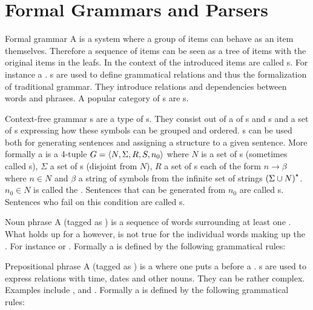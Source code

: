 \section{Formal Grammars and Parsers}
\begin{df}{Formal grammar}
A \sb{} is a system where a group of items can behave as an item themselves. Therefore a sequence of items can be seen as a tree of items with the original items in the leafs. In the context of \nlp{} the introduced items are called s. For instance a . \sb{}s are used to define grammatical relations and thus the formalization of traditional grammar. They introduce relations and dependencies between words and phrases. A popular category of \sb{}s are s.
\end{df}
\begin{df}{Context-free grammar}
\sb{}s are a type of s. They consist out of a  of s and s and a set of s expressing how these symbols can be grouped and ordered. \sb{}s can be used both for generating sentences and assigning a structure to a given sentence. More formally a \sb{} is a 4-tuple $G=\left\langle N,\Sigma,R,S,n_0\right\rangle$ where $N$ is a set of s (sometimes called s), $\Sigma$ a set of s (disjoint from $N$), $R$ a set of s each of the form $n\rightarrow\beta$ where $n\in N$ and $\beta$ a string of symbols from the infinite set of strings $\left(\Sigma\cup N\right)^{\star}$. $n_0\in N$ is called the . Sentences that can be generated from $n_0$ are called s. Sentences who fail on this condition are called s.
\end{df}
\begin{df}[NP]{Noun phrase}
A \sb{} (tagged as ) is a sequence of words surrounding at least one . What holds up for a \sb{} however, is not true for the individual words making up the \sb{}. For instance  or . Formally a \sb{} is defined by the following grammatical rules: 
\end{df}
\begin{df}[PP]{Prepositional phrase}
A \sb{} (tagged as ) is a  where one puts a  before a . \sb{}s are used to express relations with time, dates and other nouns. They can be rather complex. Examples include ,  and . Formally a \sb{} is defined by the following grammatical rules: 
\end{df}
